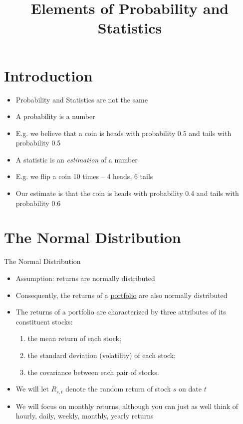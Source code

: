 \documentclass{beamer}
\title{Elements of Probability and Statistics}
\begin{document}
\maketitle

\section{Introduction}
\begin{frame}
	\begin{itemize}
		\item Probability and Statistics are not the same
		\item A probability is a number 
		\item E.g. we believe that a coin is heads with probability 0.5 and tails with probability 0.5
		\item A statistic is an \textit{estimation} of a number
		\item E.g. we flip a coin 10 times -- 4 heads, 6 tails
		\item Our estimate is that the coin is heads with probability 0.4 and tails with probability 0.6 
	\end{itemize}
\end{frame}

\section{The Normal Distribution}
\begin{frame}{The Normal Distribution}
	\begin{itemize}
		\item Assumption: returns are normally distributed
		\item Consequently, the returns of a \underline{portfolio} are also normally distributed 
		\item The returns of a portfolio are characterized by three attributes of its constituent stocks:
		\begin{enumerate}
			\item the mean return of each stock;
			\item the standard deviation (volatility) of each stock;
			\item the covariance between each pair of stocks.
		\end{enumerate}
		\item We will let $R_{s,t}$ denote the random return of stock $s$ on date $t$
		\item We will focus on monthly returns, although you can just as well think of hourly, daily, weekly, monthly, yearly returns 
	\end{itemize}
\end{frame}
\end{document}
